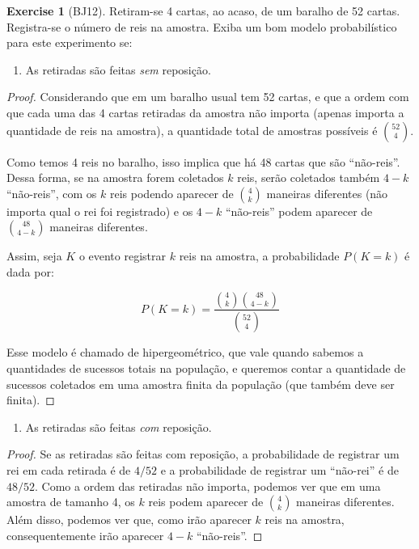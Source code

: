 \documentclass[
]{article}
\providecommand{\tightlist}{%
  \setlength{\itemsep}{0pt}\setlength{\parskip}{0pt}}
\theoremstyle{definition}
\theoremstyle{definition}
\theoremstyle{definition}
\newtheorem{exercise}{Exercise}[section]
\theoremstyle{definition}
\theoremstyle{remark}
\begin{document}
\begin{exercise}[BJ12]

Retiram-se 4 cartas, ao acaso, de um baralho de 52 cartas. Registra-se o número de reis na amostra. Exiba um bom modelo probabilístico para este experimento se:

\begin{enumerate}
\def\labelenumi{\alph{enumi})}
\tightlist
\item
  As retiradas são feitas \emph{sem} reposição.
\end{enumerate}

\begin{proof}
Considerando que em um baralho usual tem 52 cartas, e que a ordem com que cada uma das 4 cartas retiradas da amostra não importa (apenas importa a quantidade de reis na amostra), a quantidade total de amostras possíveis é \(\binom{52}{4}\).

Como temos 4 reis no baralho, isso implica que há 48 cartas que são ``não-reis''. Dessa forma, se na amostra forem coletados \(k\) reis, serão coletados também \(4-k\) ``não-reis'', com os \(k\) reis podendo aparecer de \(\binom{4}{k}\) maneiras diferentes (não importa qual o rei foi registrado) e os \(4-k\) ``não-reis'' podem aparecer de \(\binom{48}{4-k}\) maneiras diferentes.

Assim, seja \(K\) o evento registrar \(k\) reis na amostra, a probabilidade \(P(K=k)\) é dada por:

\begin{equation}
P(K=k) = \frac{\binom{4}{k}\binom{48}{4-k}}{\binom{52}{4}}
\label{eq:hgeomex}
\end{equation}

Esse modelo é chamado de hipergeométrico, que vale quando sabemos a quantidades de sucessos totais na população, e queremos contar a quantidade de sucessos coletados em uma amostra finita da população (que também deve ser finita).
\end{proof}

\begin{enumerate}
\def\labelenumi{\alph{enumi})}
\setcounter{enumi}{1}
\tightlist
\item
  As retiradas são feitas \emph{com} reposição.
\end{enumerate}

\begin{proof}
Se as retiradas são feitas com reposição, a probabilidade de registrar um rei em cada retirada é de \(4/52\) e a probabilidade de registrar um ``não-rei'' é de \(48/52\). Como a ordem das retiradas não importa, podemos ver que em uma amostra de tamanho 4, os \(k\) reis podem aparecer de \(\binom{4}{k}\) maneiras diferentes. Além disso, podemos ver que, como irão aparecer \(k\) reis na amostra, consequentemente irão aparecer \(4-k\) ``não-reis''.


\end{proof}
\end{exercise}
\end{document}
